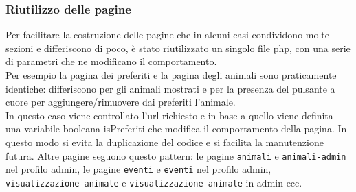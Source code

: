 \subsubsection{Riutilizzo delle pagine}
Per facilitare la costruzione delle pagine che in alcuni casi condividono molte sezioni e differiscono di poco, è stato riutilizzato un singolo file php, con una serie di parametri che ne modificano il comportamento.\\
Per esempio la pagina dei preferiti e la pagina degli animali sono praticamente identiche: differiscono per gli animali mostrati e per la presenza del pulsante a cuore per aggiungere/rimuovere dai preferiti l'animale.\\
In questo caso viene controllato l'url richiesto e in base a quello viene definita una variabile booleana isPreferiti che modifica il comportamento della pagina. In questo modo si evita la duplicazione del codice e si facilita la manutenzione futura.
Altre pagine seguono questo pattern: le pagine \texttt{animali} e \texttt{animali-admin} nel profilo admin, le pagine \texttt{eventi} e \texttt{eventi} nel profilo admin, \texttt{visualizzazione-animale} e \texttt{visualizzazione-animale} in admin ecc.